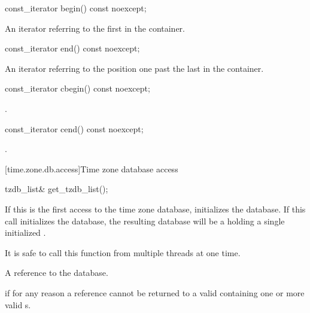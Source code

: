 %
\begin{itemdecl}
const_iterator begin() const noexcept;
\end{itemdecl}

\begin{itemdescr}
\pnum
\returns
An iterator referring to the first  in the container.
\end{itemdescr}

%
\begin{itemdecl}
const_iterator end() const noexcept;
\end{itemdecl}

\begin{itemdescr}
\pnum
\returns
An iterator referring to the position one past the last  in the container.
\end{itemdescr}

%
\begin{itemdecl}
const_iterator cbegin() const noexcept;
\end{itemdecl}

\begin{itemdescr}
\pnum
\returns
{}.
\end{itemdescr}

%
\begin{itemdecl}
const_iterator cend() const noexcept;
\end{itemdecl}

\begin{itemdescr}
\pnum
\returns
{}.
\end{itemdescr}

[time.zone.db.access]{Time zone database access}

%
\begin{itemdecl}
tzdb_list& get_tzdb_list();
\end{itemdecl}

\begin{itemdescr}
\pnum
\effects
If this is the first access to the time zone database,
initializes the database.
If this call initializes the database,
the resulting database will be a 
holding a single initialized .

\pnum
\sync
It is safe to call this function from multiple threads at one time.

\pnum
\returns
A reference to the database.

\pnum
\throws
{} if for any reason
a reference cannot be returned to a valid 
containing one or more valid s.
\end{itemdescr}

